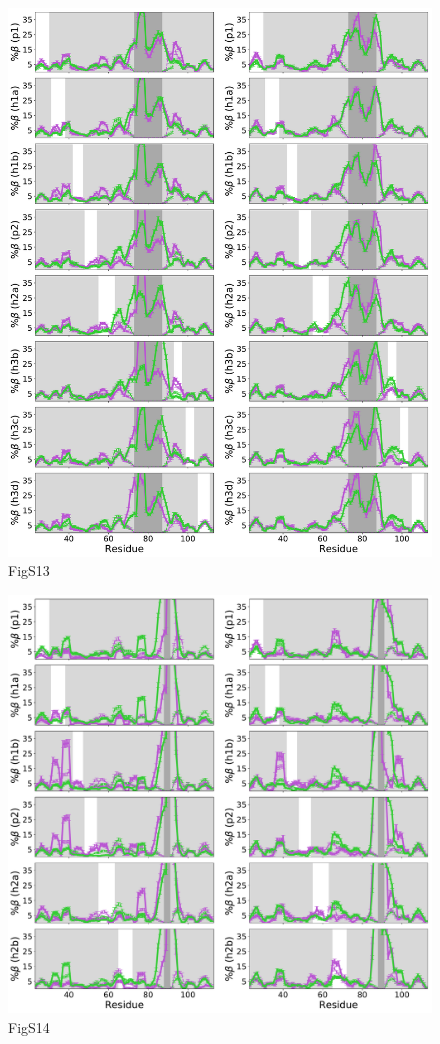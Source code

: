 \documentclass[10pt,letterpaper]{article}
\begin{document}
\begin{figure}[!ht]
\includegraphics[scale=0.5,width=\textwidth,trim={0 0cm 0 0cm},clip]{./figures/S13.pdf}
\caption{{FigS13}}
\end{figure}

\begin{figure}[!ht]
\includegraphics[scale=0.5,width=\textwidth,trim={0 0cm 0 0cm},clip]{./figures/S14.pdf}
\caption{{FigS14}}
\end{figure}
\end{document}
